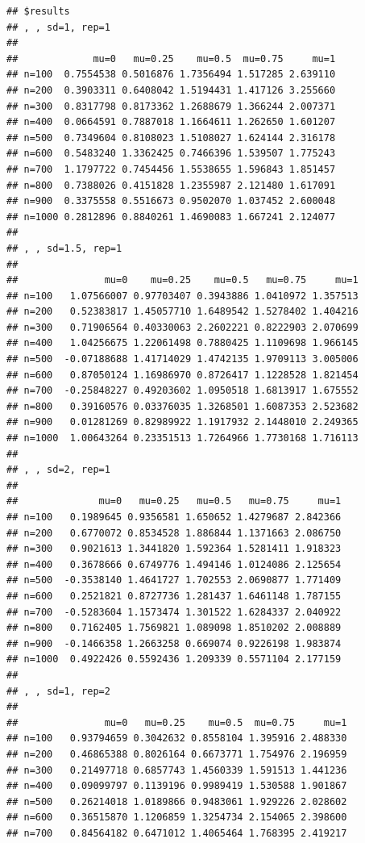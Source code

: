 \documentclass[11pt,a4paper]{article}
\begin{document}
\begin{verbatim}
## $results
## , , sd=1, rep=1
## 
##             mu=0   mu=0.25    mu=0.5  mu=0.75     mu=1
## n=100  0.7554538 0.5016876 1.7356494 1.517285 2.639110
## n=200  0.3903311 0.6408042 1.5194431 1.417126 3.255660
## n=300  0.8317798 0.8173362 1.2688679 1.366244 2.007371
## n=400  0.0664591 0.7887018 1.1664611 1.262650 1.601207
## n=500  0.7349604 0.8108023 1.5108027 1.624144 2.316178
## n=600  0.5483240 1.3362425 0.7466396 1.539507 1.775243
## n=700  1.1797722 0.7454456 1.5538655 1.596843 1.851457
## n=800  0.7388026 0.4151828 1.2355987 2.121480 1.617091
## n=900  0.3375558 0.5516673 0.9502070 1.037452 2.600048
## n=1000 0.2812896 0.8840261 1.4690083 1.667241 2.124077
## 
## , , sd=1.5, rep=1
## 
##               mu=0    mu=0.25    mu=0.5   mu=0.75     mu=1
## n=100   1.07566007 0.97703407 0.3943886 1.0410972 1.357513
## n=200   0.52383817 1.45057710 1.6489542 1.5278402 1.404216
## n=300   0.71906564 0.40330063 2.2602221 0.8222903 2.070699
## n=400   1.04256675 1.22061498 0.7880425 1.1109698 1.966145
## n=500  -0.07188688 1.41714029 1.4742135 1.9709113 3.005006
## n=600   0.87050124 1.16986970 0.8726417 1.1228528 1.821454
## n=700  -0.25848227 0.49203602 1.0950518 1.6813917 1.675552
## n=800   0.39160576 0.03376035 1.3268501 1.6087353 2.523682
## n=900   0.01281269 0.82989922 1.1917932 2.1448010 2.249365
## n=1000  1.00643264 0.23351513 1.7264966 1.7730168 1.716113
## 
## , , sd=2, rep=1
## 
##              mu=0   mu=0.25   mu=0.5   mu=0.75     mu=1
## n=100   0.1989645 0.9356581 1.650652 1.4279687 2.842366
## n=200   0.6770072 0.8534528 1.886844 1.1371663 2.086750
## n=300   0.9021613 1.3441820 1.592364 1.5281411 1.918323
## n=400   0.3678666 0.6749776 1.494146 1.0124086 2.125654
## n=500  -0.3538140 1.4641727 1.702553 2.0690877 1.771409
## n=600   0.2521821 0.8727736 1.281437 1.6461148 1.787155
## n=700  -0.5283604 1.1573474 1.301522 1.6284337 2.040922
## n=800   0.7162405 1.7569821 1.089098 1.8510202 2.008889
## n=900  -0.1466358 1.2663258 0.669074 0.9226198 1.983874
## n=1000  0.4922426 0.5592436 1.209339 0.5571104 2.177159
## 
## , , sd=1, rep=2
## 
##               mu=0   mu=0.25    mu=0.5  mu=0.75     mu=1
## n=100   0.93794659 0.3042632 0.8558104 1.395916 2.488330
## n=200   0.46865388 0.8026164 0.6673771 1.754976 2.196959
## n=300   0.21497718 0.6857743 1.4560339 1.591513 1.441236
## n=400   0.09099797 0.1139196 0.9989419 1.530588 1.901867
## n=500   0.26214018 1.0189866 0.9483061 1.929226 2.028602
## n=600   0.36515870 1.1206859 1.3254734 2.154065 2.398600
## n=700   0.84564182 0.6471012 1.4065464 1.768395 2.419217

\end{verbatim}
\end{document}
